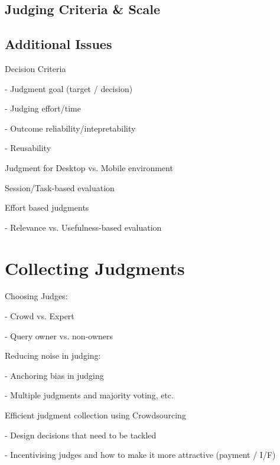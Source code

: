 \documentclass[openany]{now} %
\newcommand{\newpar}{\bigskip\noindent}
\begin{document}
\subsection{Judging Criteria \& Scale}

\subsection{Additional Issues}


\newpar
Decision Criteria

- Judgment goal (target / decision)

- Judging effort/time

- Outcome reliability/intepretability

- Reusability




\newpar
Judgment for Desktop vs. Mobile environment \cite{Verma:2016:CRMD}

\newpar
Session/Task-based evaluation \cite{Moraveji:2011} \cite{Xu:2009}

\newpar
Effort based judgments \cite{Yilmaz:2014} \cite{Verma:2016:EBJ}

- Relevance vs. Usefulness-based evaluation 

\section{Collecting Judgments}

Choosing Judges: 

- Crowd vs. Expert \cite{Kazai:2013} \cite{Alonso20121053}

- Query owner vs. non-owners \cite{Chouldechova:2013}

\newpar
Reducing noise in judging: 

- Anchoring bias in judging \cite{Shokouhi:2015}

- Multiple judgments and majority voting, etc. \cite{Venanzi:2014}

\cite{aroyo2013measuring} \cite{aroyo2013crowd}

\newpar
Efficient judgment collection using Crowdsourcing

- Design decisions that need to be tackled  \cite{Blanco:2011} \cite{Kazai2012} \cite{Alonso2012} \cite{Alonso:2015} \cite{Scholer:2013} 

- Incentivising judges and how to make it more attractive (payment / I/F)
\cite{Megorskaya2015} \cite{Davtyan2015}  \cite{Rokicki:2014}  \cite{Eickhoff:2012}
\end{document}
